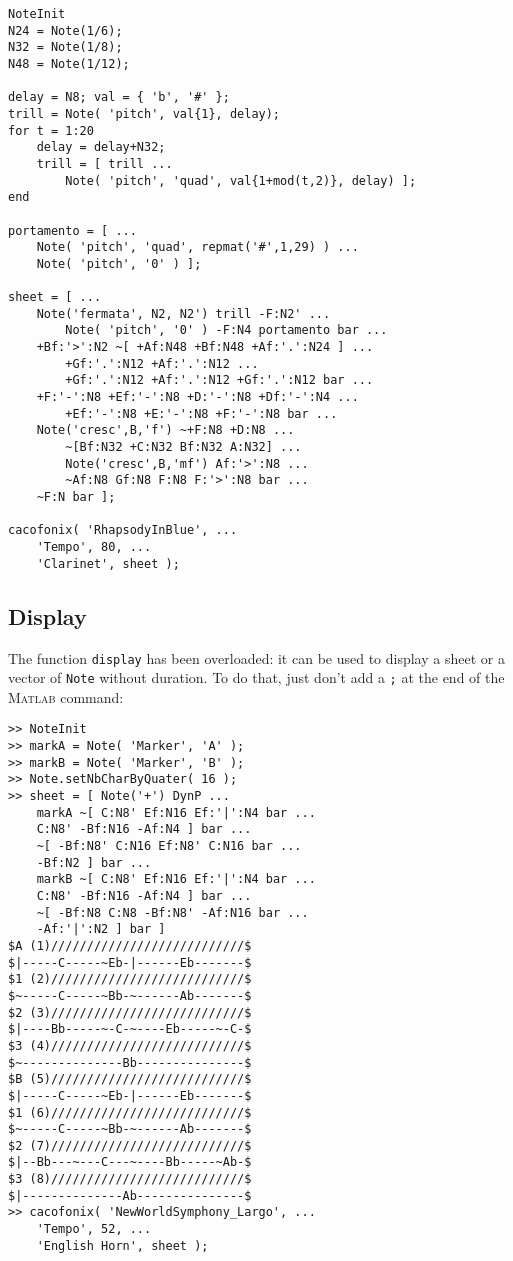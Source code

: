 \documentclass{article}
\newcommand{\matlab}{\textsc{Matlab}\xspace}
\newcommand{\note}{\lstinline!Note!\xspace}
\begin{document}
\begin{lstlisting}
NoteInit
N24 = Note(1/6);
N32 = Note(1/8);
N48 = Note(1/12);

delay = N8; val = { 'b', '#' };
trill = Note( 'pitch', val{1}, delay);
for t = 1:20
	delay = delay+N32;
	trill = [ trill ...
		Note( 'pitch', 'quad', val{1+mod(t,2)}, delay) ];
end

portamento = [ ...
	Note( 'pitch', 'quad', repmat('#',1,29) ) ...
	Note( 'pitch', '0' ) ];

sheet = [ ...
	Note('fermata', N2, N2') trill -F:N2' ...
		Note( 'pitch', '0' ) -F:N4 portamento bar ...
	+Bf:'>':N2 ~[ +Af:N48 +Bf:N48 +Af:'.':N24 ] ...
		+Gf:'.':N12 +Af:'.':N12 ...
		+Gf:'.':N12 +Af:'.':N12 +Gf:'.':N12 bar ...
	+F:'-':N8 +Ef:'-':N8 +D:'-':N8 +Df:'-':N4 ...
		+Ef:'-':N8 +E:'-':N8 +F:'-':N8 bar ...
	Note('cresc',B,'f') ~+F:N8 +D:N8 ...
		~[Bf:N32 +C:N32 Bf:N32 A:N32] ...
		Note('cresc',B,'mf') Af:'>':N8 ...
		~Af:N8 Gf:N8 F:N8 F:'>':N8 bar ...
	~F:N bar ];

cacofonix( 'RhapsodyInBlue', ...
	'Tempo', 80, ...
	'Clarinet', sheet );
\end{lstlisting}

\subsection{Display}
\label{sec:Display}

The function \lstinline!display! has been overloaded: it can be used to display a sheet or a vector of \note without duration. To do that, just don't add a \lstinline!;! at the end of the \matlab command: \\

\begin{lstlisting}
>> NoteInit
>> markA = Note( 'Marker', 'A' );
>> markB = Note( 'Marker', 'B' );
>> Note.setNbCharByQuater( 16 );
>> sheet = [ Note('+') DynP ...
	markA ~[ C:N8' Ef:N16 Ef:'|':N4 bar ...
	C:N8' -Bf:N16 -Af:N4 ] bar ...
	~[ -Bf:N8' C:N16 Ef:N8' C:N16 bar ...
	-Bf:N2 ] bar ...
	markB ~[ C:N8' Ef:N16 Ef:'|':N4 bar ...
	C:N8' -Bf:N16 -Af:N4 ] bar ...
	~[ -Bf:N8 C:N8 -Bf:N8' -Af:N16 bar ...
	-Af:'|':N2 ] bar ]
$A (1)///////////////////////////$
$|-----C-----~Eb-|------Eb-------$
$1 (2)///////////////////////////$
$~-----C-----~Bb-~------Ab-------$
$2 (3)///////////////////////////$
$|----Bb-----~-C-~----Eb-----~-C-$
$3 (4)///////////////////////////$
$~--------------Bb---------------$
$B (5)///////////////////////////$
$|-----C-----~Eb-|------Eb-------$
$1 (6)///////////////////////////$
$~-----C-----~Bb-~------Ab-------$
$2 (7)///////////////////////////$
$|--Bb---~---C---~----Bb-----~Ab-$
$3 (8)///////////////////////////$
$|--------------Ab---------------$
>> cacofonix( 'NewWorldSymphony_Largo', ...
	'Tempo', 52, ...
	'English Horn', sheet );
\end{lstlisting}
\end{document}
